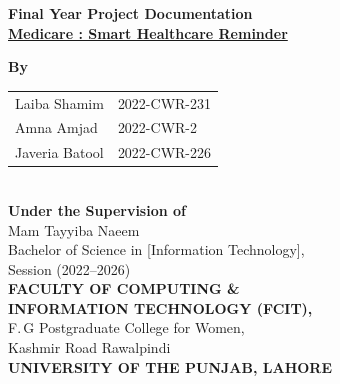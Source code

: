 \begin{titlepage}
\centering
\vspace*{0.5cm}
{\LARGE\bfseries Final Year Project Documentation}\\[0.5cm]
{\Large\bfseries\underline{Medicare : Smart Healthcare Reminder}}\\[1.5cm]

\vspace{2cm}

{\large\textbf{By}}\\[0.5cm]

\begin{tabular}{l l}
Laiba Shamim & 2022-CWR-231 \\
Amna Amjad & 2022-CWR-2 \\
Javeria Batool & 2022-CWR-226 \\
\end{tabular}\\[1cm]

{\large\textbf{Under the Supervision of}}\\[0.3cm]
{\large Mam Tayyiba Naeem}\\[1cm]

{\large Bachelor of Science in [Information Technology],\\
Session (2022--2026)\\[0.5cm]
\textbf{FACULTY OF COMPUTING \&\\
INFORMATION TECHNOLOGY (FCIT),}\\
F.\,G Postgraduate College for Women,\\
Kashmir Road Rawalpindi\\[0.3cm]
\textbf{UNIVERSITY OF THE PUNJAB, LAHORE}}

\vfill
\end{titlepage}

